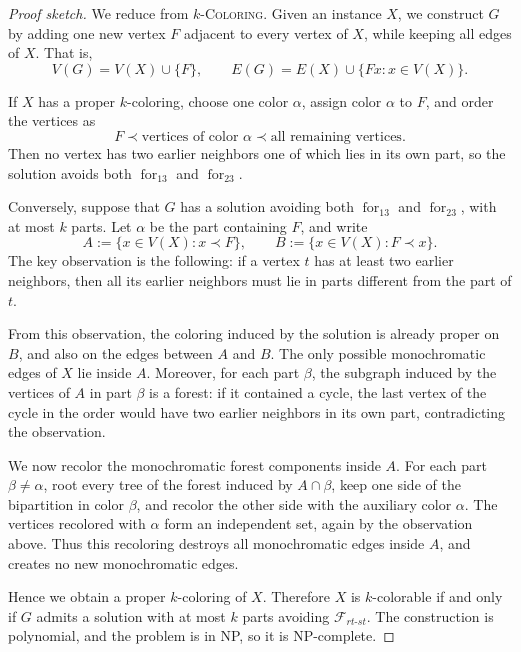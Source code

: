 \documentclass[12pt]{article}
\theoremstyle{plain}
\theoremstyle{definition}
\theoremstyle{remark}
\theoremstyle{definition}
\newcommand{\forlabel}{\mathrm{for}}
\DeclareRobustCommand{\forparam}[1]{%
  \ensuremath{\mathop{\forlabel}\nolimits_{#1}}%
}
\newcommand{\forrt}{\forparam{13}}
\newcommand{\forst}{\forparam{23}}
\begin{document}
\begin{proof}[Proof sketch]
We reduce from \(k\)-\textsc{Coloring}. Given an instance \(X\), we construct \(G\) by adding one new vertex \(F\)
adjacent to every vertex of \(X\), while keeping all edges of \(X\). That is,
\[
V(G)=V(X)\cup\{F\},
\qquad
E(G)=E(X)\cup \{Fx:x\in V(X)\}.
\]

If \(X\) has a proper \(k\)-coloring, choose one color \(\alpha\), assign color \(\alpha\) to \(F\), and order the vertices as
\[
F \prec \text{vertices of color }\alpha \prec \text{all remaining vertices}.
\]
Then no vertex has two earlier neighbors one of which lies in its own part, so the solution avoids both
\(\forrt\) and \(\forst\).

Conversely, suppose that \(G\) has a solution avoiding both \(\forrt\) and \(\forst\), with at most \(k\) parts.
Let \(\alpha\) be the part containing \(F\), and write
\[
A:=\{x\in V(X):x\prec F\},
\qquad
B:=\{x\in V(X):F\prec x\}.
\]
The key observation is the following: if a vertex \(t\) has at least two earlier neighbors, then all its earlier
neighbors must lie in parts different from the part of \(t\).

From this observation, the coloring induced by the solution is already proper on \(B\), and also on the edges between
\(A\) and \(B\). The only possible monochromatic edges of \(X\) lie inside \(A\). Moreover, for each part \(\beta\),
the subgraph induced by the vertices of \(A\) in part \(\beta\) is a forest: if it contained a cycle, the last vertex
of the cycle in the order would have two earlier neighbors in its own part, contradicting the observation.

We now recolor the monochromatic forest components inside \(A\). For each part \(\beta\neq \alpha\), root every tree
of the forest induced by \(A\cap \beta\), keep one side of the bipartition in color \(\beta\), and recolor the other
side with the auxiliary color \(\alpha\). The vertices recolored with \(\alpha\) form an independent set, again by the
observation above. Thus this recoloring destroys all monochromatic edges inside \(A\), and creates no new monochromatic
edges.

Hence we obtain a proper \(k\)-coloring of \(X\). Therefore \(X\) is \(k\)-colorable if and only if \(G\) admits a
solution with at most \(k\) parts avoiding \(\mathcal F_{rt\text{-}st}\). The construction is polynomial, and the
problem is in NP, so it is NP-complete.
\end{proof}
\end{document}
